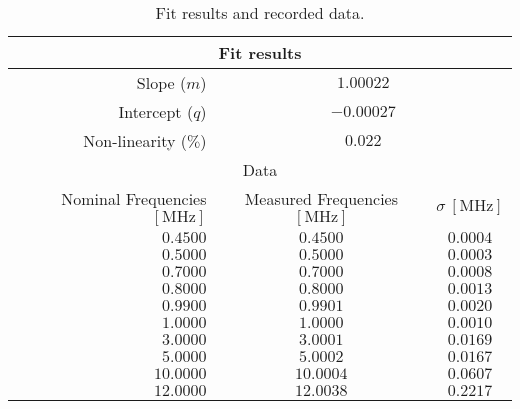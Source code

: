 \begin{table}[!htp]
	\centering
	\begin{tabular}{rcc}
		\toprule
		\multicolumn{3}{c}{Fit results} \\
		\midrule
		Slope ($m$) &\multicolumn{2}{c}{$1.00022$} \\
		Intercept ($q$) &\multicolumn{2}{c}{$-0.00027$} \\
		Non-linearity ($\%$) &\multicolumn{2}{c}{$0.022$} \\
		\midrule
		\multicolumn{3}{c}{Data}\\
		\midrule
		Nominal Frequencies $\left[ \si{\mega\hertz}\right]$ & Measured Frequencies $\left[ \si{\mega\hertz}\right]$ & $\sigma \ \left[ \si{\mega\hertz}\right]$ \\
		\midrule
		$0.4500$ & $0.4500$ & $0.0004$ \\
		$0.5000$ & $0.5000$ & $0.0003$ \\
		$0.7000$ & $0.7000$ & $0.0008$ \\
		$0.8000$ & $0.8000$ & $0.0013$ \\
		$0.9900$ & $0.9901$ & $0.0020$ \\
		$1.0000$ & $1.0000$ & $0.0010$ \\
		$3.0000$ & $3.0001$ & $0.0169$ \\
		$5.0000$ & $5.0002$ & $0.0167$ \\
		$10.0000$ & $10.0004$ & $0.0607$ \\
		$12.0000$ & $12.0038$ & $0.2217$ \\
		\bottomrule
	\end{tabular}
	\caption{Fit results and recorded data.}
	\label{tab:linearity_data}
\end{table}